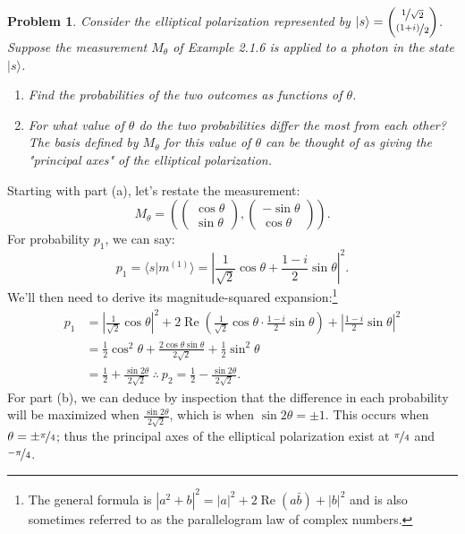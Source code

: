 \documentclass[12pt]{article}
\newenvironment{answer}
    {\begin{adjustwidth}{0pt}{0pt}}
    {\end{adjustwidth}}
\newtheorem{problem}{Problem}
\theoremstyle{remark}  %
\begin{document}
\begin{problem}
    Consider the elliptical polarization represented by $|s\rangle = \begin{pmatrix}
        \nicefrac{1}{\sqrt{2}} \\
        \nicefrac{(1+i)}{2}
    \end{pmatrix}$. Suppose the measurement $M_\theta$ of Example 2.1.6 is applied to a photon in the state $|s\rangle$.
    \begin{enumerate}[label=(\alph*)]
        \item Find the probabilities of the two outcomes as functions of $\theta$.
        \item For what value of $\theta$ do the two probabilities differ the most from each other? The basis defined by $M_\theta$ for this value of $\theta$ can be thought of as giving the "principal axes" of the elliptical polarization.
    \end{enumerate}
\end{problem}
\begin{answer}
    Starting with part (a), let's restate the measurement: $$M_\theta=\left(\begin{pmatrix}
        \cos\theta \\
        \sin\theta
    \end{pmatrix},\begin{pmatrix}
        -\sin\theta \\
        \cos\theta
    \end{pmatrix}\right).$$ For probability $p_1$, we can say: $$p_1 = \langle s|m^{(1)} \rangle = \left|\frac{1}{\sqrt{2}}\cos\theta + \frac{1-i}{2}\sin\theta\right|^2.$$ We'll then need to derive its magnitude-squared expansion:\footnote{The general formula is $|a^2+b|^2=|a|^2+2\operatorname{Re}(a\bar{b})+|b|^2$ and is also sometimes referred to as the parallelogram law of complex numbers.} \begin{align*}
        p_1 &= \left|\frac{1}{\sqrt{2}}\cos\theta\right|^2 + 2\operatorname{Re}(\frac{1}{\sqrt{2}}\cos\theta\cdot \frac{1-i}{2}\sin\theta) + \left|\frac{1-i}{2}\sin\theta\right|^2 \\
        &= \frac{1}{2}\cos^2\theta + \frac{2\cos\theta\sin\theta}{2\sqrt{2}} + \frac{1}{2}\sin^2\theta \\
        &= \frac{1}{2} + \frac{\sin2\theta}{2\sqrt{2}}\ \therefore\  p_2 = \frac{1}{2} - \frac{\sin2\theta}{2\sqrt{2}}.
    \end{align*} For part (b), we can deduce by inspection that the difference in each probability will be maximized when $\frac{\sin2\theta}{2\sqrt{2}}$, which is when $\sin2\theta=\pm 1$. This occurs when $\theta = \pm\nicefrac{\pi}{4}$; thus the principal axes of the elliptical polarization exist at $\nicefrac{\pi}{4}$ and $\nicefrac{-\pi}{4}$.
\end{answer}
\end{document}
